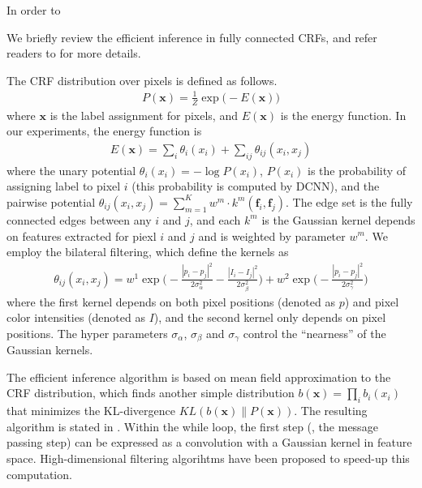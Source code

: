 In order to 

We briefly review the efficient inference in fully connected CRFs, and refer readers to \citep{krahenbuhl2011efficient} for more details. 

The CRF distribution over pixels is defined as follows.
\begin{align}
  P(\boldsymbol{x}) = \frac{1}{Z} \exp \Big(-E(\boldsymbol{x})\Big)
\end{align}
where $\boldsymbol{x}$ is the label assignment for pixels, and $E(\boldsymbol{x})$ is the energy function. In our experiments, the energy function is
\begin{align}
  E(\boldsymbol{x}) = \sum_i \theta_i(x_i) + \sum_{ij} \theta_{ij}(x_i, x_j)
\end{align}
where the unary potential $\theta_i(x_i) = - \log P(x_i)$, $P(x_i)$ is the probability of assigning label to pixel $i$ (this probability is computed by DCNN), and the pairwise potential $\theta_{ij}(x_i, x_j) = \sum_{m=1}^{K} w^m \cdot k^m(\boldsymbol{f}_i, \boldsymbol{f}_j)$. The edge set is the fully connected edges between any $i$ and $j$, and each $k^m$ is the Gaussian kernel depends on features extracted for piexl $i$ and $j$ and is weighted by parameter $w^m$. We employ the bilateral filtering, which define the kernels as 
\begin{align}
  \theta_{ij}(x_i, x_j) = w^1 \exp \Big(-\frac{|p_i-p_j|^2}{2\sigma_\alpha^2} -\frac{|I_i-I_j|^2}{2\sigma_\beta^2} \Big) + w^2 \exp \Big(-\frac{|p_i-p_j|^2}{2\sigma_\gamma^2}\Big)
\end{align}
where the first kernel depends on both pixel positions (denoted as $p$) and pixel color intensities (denoted as $I$), and the second kernel only depends on pixel positions. The hyper parameters $\sigma_\alpha$, $\sigma_\beta$ and $\sigma_\gamma$ control the ``nearness'' of the Gaussian kernels.

The efficient inference algorithm is based on mean field approximation to the CRF distribution, which finds another simple distribution $b(\boldsymbol{x}) = \prod_i b_i(x_i)$ that minimizes the KL-divergence $KL(b(\boldsymbol{x}) \| P(\boldsymbol{x}))$. The resulting algorithm is stated in . Within the while loop, the first step (\ie, the message passing step) can be expressed as a convolution with a Gaussian kernel in feature space. High-dimensional filtering algorihtms \citep{adams2010fast} have been proposed to speed-up this computation.


